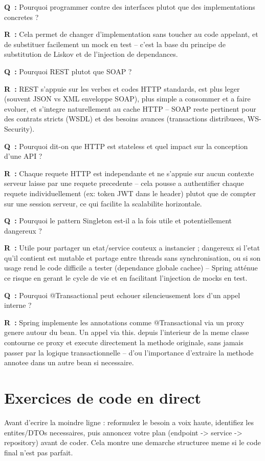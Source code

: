 \documentclass[11pt,a4paper]{article}
\newcommand{\qr}[2]{%
  \par\noindent\textbf{Q~:} #1\par
  \noindent\textbf{R~:} #2\par\smallskip
}
\begin{document}
\qr{Pourquoi programmer contre des interfaces plutot que des implementations concretes ?}{Cela permet de changer d'implementation sans toucher au code appelant, et de substituer facilement un mock en test -- c'est la base du principe de substitution de Liskov et de l'injection de dependances.}

\qr{Pourquoi REST plutot que SOAP ?}{REST s'appuie sur les verbes et codes HTTP standards, est plus leger (souvent JSON vs XML enveloppe SOAP), plus simple a consommer et a faire evoluer, et s'integre naturellement au cache HTTP -- SOAP reste pertinent pour des contrats stricts (WSDL) et des besoins avances (transactions distribuees, WS-Security).}

\qr{Pourquoi dit-on que HTTP est stateless et quel impact sur la conception d'une API ?}{Chaque requete HTTP est independante et ne s'appuie sur aucun contexte serveur laisse par une requete precedente -- cela pousse a authentifier chaque requete individuellement (ex: token JWT dans le header) plutot que de compter sur une session serveur, ce qui facilite la scalabilite horizontale.}

\qr{Pourquoi le pattern Singleton est-il a la fois utile et potentiellement dangereux ?}{Utile pour partager un etat/service couteux a instancier ; dangereux si l'etat qu'il contient est mutable et partage entre threads sans synchronisation, ou si son usage rend le code difficile a tester (dependance globale cachee) -- Spring att\'enue ce risque en gerant le cycle de vie et en facilitant l'injection de mocks en test.}

\qr{Pourquoi @Transactional peut echouer silencieusement lors d'un appel interne ?}{Spring implemente les annotations comme @Transactional via un proxy genere autour du bean. Un appel via this. depuis l'interieur de la meme classe contourne ce proxy et execute directement la methode originale, sans jamais passer par la logique transactionnelle -- d'ou l'importance d'extraire la methode annotee dans un autre bean si necessaire.}

\newpage
\section{Exercices de code en direct}

\begin{cle}
Avant d'ecrire la moindre ligne : reformulez le besoin a voix haute, identifiez les entites/DTOs necessaires, puis annoncez votre plan (endpoint -> service -> repository) avant de coder. Cela montre une demarche structuree meme si le code final n'est pas parfait.
\end{cle}
\end{document}
